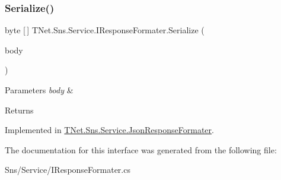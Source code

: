 \subsubsection{\texorpdfstring{Serialize()}{Serialize()}}
{\footnotesize\ttfamily byte \mbox{[}$\,$\mbox{]} T\+Net.\+Sns.\+Service.\+I\+Response\+Formater.\+Serialize (\begin{DoxyParamCaption}\item[{\mbox{\hyperlink{class_t_net_1_1_sns_1_1_service_1_1_response_body}{Response\+Body}}}]{body }\end{DoxyParamCaption})}






\begin{DoxyParams}{Parameters}
{\em body} & \\
\hline
\end{DoxyParams}
\begin{DoxyReturn}{Returns}

\end{DoxyReturn}


Implemented in \mbox{\hyperlink{class_t_net_1_1_sns_1_1_service_1_1_json_response_formater_a84838cfd0a9325d9eff608a37ca57ce2}{T\+Net.\+Sns.\+Service.\+Json\+Response\+Formater}}.



The documentation for this interface was generated from the following file\+:\begin{DoxyCompactItemize}
\item 
Sns/\+Service/I\+Response\+Formater.\+cs\end{DoxyCompactItemize}
